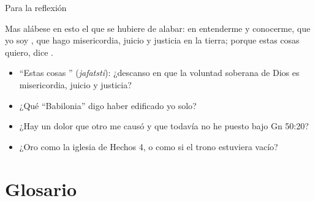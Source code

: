 \begin{frame}{Para la reflexión}
\begin{cita}Mas alábese en esto el que se hubiere de alabar: en entenderme y conocerme, que yo soy \SENOR, que hago misericordia, juicio y justicia en la tierra; porque estas cosas quiero, dice \SENOR.\end{cita}
\begin{center}\end{center}
\small
\begin{itemize}
\item ``Estas cosas '' (\emph{jafatsti}): ¿descanso en que la voluntad soberana de Dios es misericordia, juicio y justicia?
\item ¿Qué ``Babilonia'' digo haber edificado yo solo?
\item ¿Hay un dolor que otro me causó y que todavía no he puesto bajo Gn 50:20?
\item ¿Oro como la iglesia de Hechos 4, o como si el trono estuviera vacío?
\end{itemize}
\end{frame}

\section{Glosario}

